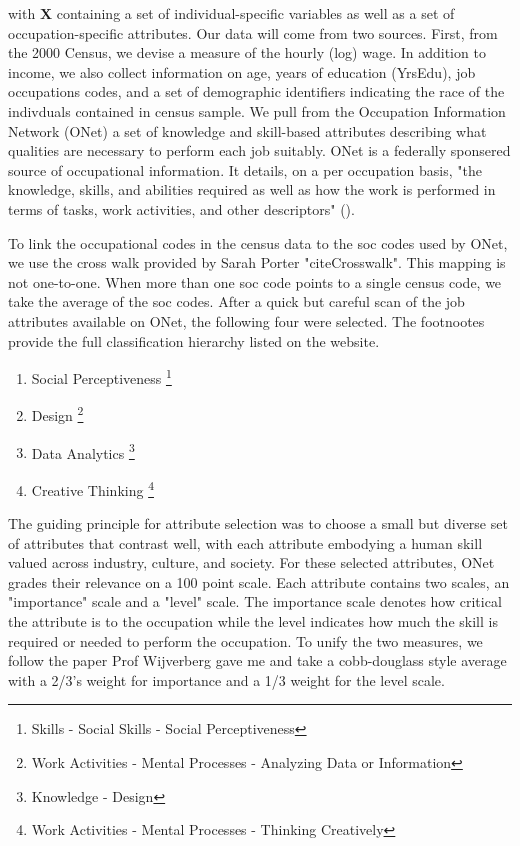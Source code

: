 \documentclass[12pt]{article}
\begin{document}
with $\boldsymbol{X}$ containing a set of individual-specific 
variables as well as a set of occupation-specific attributes. 
Our data will come from two sources. First, from the 2000 Census,
we devise a measure of the hourly (log) wage. In addition to income, we also collect information on age,
years of education (YrsEdu), job occupations codes, 
and a set of demographic identifiers indicating the race of the
indivduals contained in census sample. We pull from the
Occupation Information Network (ONet) a set of knowledge and skill-based
attributes describing what qualities are necessary to perform each
job suitably. ONet is a federally sponsered source of occupational
information. It details, on a per occupation basis, "the knowledge,
skills, and abilities required as well as how the work is
performed in terms of tasks, work activities, and other descriptors"
(\cite{ONET}).

To link the occupational codes in the census data to the soc codes used
by ONet, we use the cross walk provided by Sarah Porter
"cite{Crosswalk}". This mapping is not one-to-one. When more than one soc code points to a single census
code, we take the average of the soc codes. After a quick but careful scan of the job attributes
available on ONet, the following four were selected. The footnootes
provide the full classification hierarchy listed on the website. 

\begin{enumerate}
  \item Social Perceptiveness \footnote{Skills - Social Skills - Social Perceptiveness}
  \item Design \footnote{Work Activities - Mental Processes - Analyzing Data or Information}
  \item Data Analytics \footnote{Knowledge - Design}
  \item Creative Thinking \footnote{Work Activities - Mental Processes - Thinking Creatively}
\end{enumerate}

The guiding principle for attribute selection was to choose a small but
diverse set of attributes that contrast well, with each attribute embodying
a human skill valued across industry, culture, and society. For these selected
attributes, ONet grades their relevance on a
100 point scale. Each attribute contains two scales, an "importance"
scale and a "level" scale. The importance scale denotes how critical the
attribute is to the occupation while the level indicates how much the
skill is required or needed to perform the occupation. To unify the two
measures, we follow the paper Prof Wijverberg gave me and take a
cobb-douglass style average with a 2/3's weight for importance and a 1/3
weight for the level scale.
\end{document}
